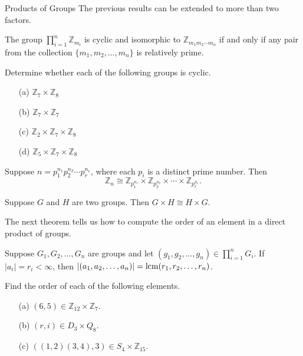 \begin{section}{Products of Groups}
The previous results can be extended to more than two factors.

\begin{theorem}
The group \(\prod_{i=1}^n \mathbb{Z}_{m_i}\) is cyclic and isomorphic to \(\mathbb{Z}_{m_1m_2\cdots m_n}\) if and only if any pair from the collection \(\{m_1,m_2,\ldots, m_n\}\) is relatively prime.
\end{theorem}

\begin{exercise}
Determine whether each of the following groups is cyclic.
\begin{enumerate}
\item[(a)] \(\mathbb{Z}_7\times \mathbb{Z}_8\)
\item[(b)] \(\mathbb{Z}_7\times \mathbb{Z}_7\)
\item[(c)] \(\mathbb{Z}_2\times \mathbb{Z}_7\times \mathbb{Z}_8\)
\item[(d)] \(\mathbb{Z}_5\times \mathbb{Z}_7\times \mathbb{Z}_8\)
\end{enumerate}
\end{exercise}

\begin{theorem}
Suppose \(n=p_1^{n_1}p_2^{n_2}\cdots p_r^{n_r}\), where each \(p_i\) is a distinct prime number.  Then
\[
\mathbb{Z}_n\cong \mathbb{Z}_{p_1^{n_1}}\times \mathbb{Z}_{p_2^{n_2}}\times \cdots \times \mathbb{Z}_{p_r^{n_r}}.
\]
\end{theorem}

\begin{theorem}
Suppose \(G\) and \(H\) are two groups.  Then \(G\times H\cong H\times G\).
\end{theorem}

The next theorem tells us how to compute the order of an element in a direct product of groups.

\begin{theorem}
Suppose \(G_1, G_2,\ldots, G_n\) are groups and let \((g_1,g_2,\ldots, g_n)\in \prod_{i=1}^nG_i\).  If \(|a_i|=r_i<\infty\), then \(|(a_1,a_2,\ldots, a_n)|=\operatorname{lcm}(r_1,r_2,\ldots,r_n)\).
\end{theorem}

\begin{exercise}
Find the order of each of the following elements.
\begin{enumerate}
\item[(a)] \((6,5)\in\mathbb{Z}_{12}\times \mathbb{Z}_7\).
\item[(b)] \((r,i)\in D_3\times Q_8\).
\item[(c)] \(((1,2)(3,4),3)\in S_4\times \mathbb{Z}_{15}\).
\end{enumerate}
\end{exercise}


\end{section}
